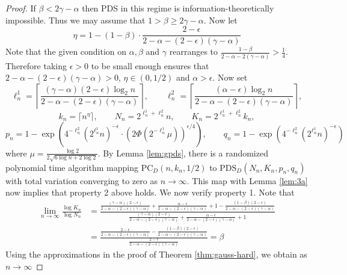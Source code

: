 \begin{proof}
If $\beta < 2\gamma - \alpha$ then PDS in this regime is information-theoretically impossible. Thus we may assume that $1 > \beta \ge 2\gamma - \alpha$. Now let
$$\eta =1 - ( 1- \beta) \cdot \frac{2 - \epsilon}{2 - \alpha - (2 - \epsilon) ( \gamma - \alpha)}$$
Note that the given condition on $\alpha, \beta$ and $\gamma$ rearranges to $\frac{1 - \beta}{2 - \alpha - 2(\gamma - \alpha)} > \frac{1}{4}$. Therefore taking $\epsilon > 0$ to be small enough ensures that $2 - \alpha - (2 - \epsilon)(\gamma - \alpha) > 0$, $\eta \in (0, 1/2)$ and $\alpha > \epsilon$. Now set
$$\ell_n^1 = \left\lceil \frac{(\gamma - \alpha)(2 - \epsilon) \log_2 n}{2 - \alpha - (2 - \epsilon) ( \gamma - \alpha)} \right\rceil, \quad \quad \ell_n^2 = \left\lceil \frac{(\alpha - \epsilon)\log_2 n}{2 - \alpha - (2 - \epsilon) ( \gamma - \alpha)} \right\rceil,$$
$$k_n = \lceil n^{\eta} \rceil, \quad \quad N_n = 2^{\ell^1_n + \ell_n^2} n, \quad \quad K_n = 2^{\ell_n^1 + \ell_n^2} k_n,$$
$$p_n = 1 - \exp\left( 4^{-\ell^2_n} \left(2^{\ell^1_n}n\right)^{-\epsilon} \cdot \left( 2 \Phi\left(2^{-\ell^1_n} \mu \right) \right)^{\epsilon/4} \right), \quad \quad q_n = 1 - \exp\left( 4^{-\ell^2_n} \left(2^{\ell^1_n} n\right)^{-\epsilon} \right)$$
where $\mu = \frac{\log 2}{2 \sqrt{6 \log n + 2\log 2}}$. By Lemma \ref{lem:gpds}, there is a randomized polynomial time algorithm mapping $\text{PC}_D(n, k_n, 1/2)$ to $\text{PDS}_D(N_n, K_n, p_n, q_n)$ with total variation converging to zero as $n \to \infty$. This map with Lemma \ref{lem:3a} now implies that property 2 above holds. We now verify property 1. Note that
\begin{align*}
\lim_{n \to \infty} \frac{\log K_n}{\log N_n} &= \frac{\frac{(\gamma - \alpha)(2 - \epsilon)}{2 - \alpha - (2 - \epsilon) ( \gamma - \alpha)} + \frac{\alpha - \epsilon}{2 - \alpha - (2 - \epsilon) ( \gamma - \alpha)} + 1 - \frac{(1 - \beta)(2 - \epsilon)}{2 - \alpha - (2 - \epsilon) ( \gamma - \alpha)}}{\frac{(\gamma - \alpha)(2 - \epsilon)}{2 - \alpha - (2 - \epsilon) ( \gamma - \alpha)} + \frac{\alpha - \epsilon}{2 - \alpha - (2 - \epsilon) ( \gamma - \alpha)} + 1} \\
&= \frac{\frac{2 - \epsilon}{2 - \alpha - (2 - \epsilon) ( \gamma - \alpha)} - \frac{(1 - \beta)(2 - \epsilon)}{2 - \alpha - (2 - \epsilon) ( \gamma - \alpha)}}{\frac{2 - \epsilon}{2 - \alpha - (2 - \epsilon) ( \gamma - \alpha)}} = \beta
\end{align*}
Using the approximations in the proof of Theorem \ref{thm:gauss-hard}, we obtain as $n \to \infty$

\end{proof}

